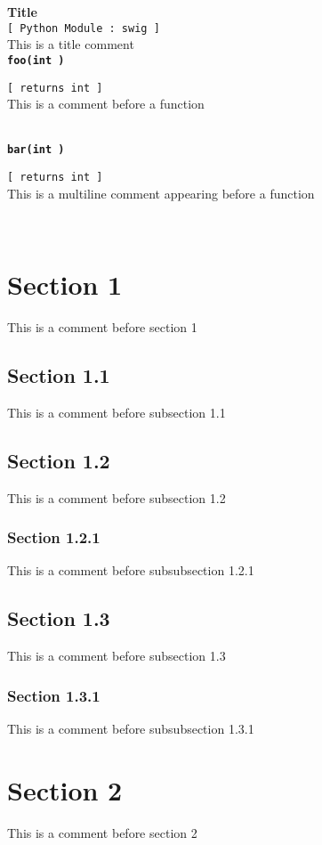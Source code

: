 \setlength{\parindent}{0.0in}
\setlength{\textwidth}{6.5in}
\setlength{\oddsidemargin}{0.0in}
\pagestyle{headings}

{\Large \bf  Title }\\
{\tt [ Python Module : swig ]  }\\
   This is a title comment   
\\{\tt \bf foo(int ) }
\\
\makebox[0.5in]{}\begin{minipage}[t]{6in}
{\tt [ returns int  ]  }\\
   This is a comment before a function   
\\

\end{minipage}\\

{\tt \bf bar(int ) }
\\
\makebox[0.5in]{}\begin{minipage}[t]{6in}
{\tt [ returns int  ]  }\\
   This is a 
   multiline comment
   appearing before
   a function
\\

\end{minipage}\\

\section{Section 1}   This is a comment before section 1   
\\\subsection{Section 1.1}   This is a comment before subsection 1.1   
\\\subsection{Section 1.2}   This is a comment before subsection 1.2   
\\\subsubsection{Section 1.2.1}   This is a comment before subsubsection 1.2.1   
\\\subsection{Section 1.3}   This is a comment before subsection 1.3   
\\\subsubsection{Section 1.3.1}   This is a comment before subsubsection 1.3.1   
\\\section{Section 2}   This is a comment before section 2   
\\

